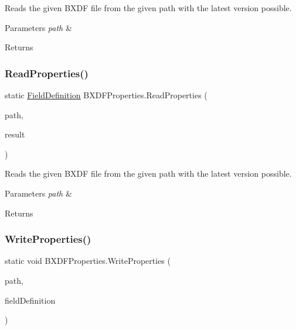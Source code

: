 Reads the given B\+X\+DF file from the given path with the latest version possible. 


\begin{DoxyParams}{Parameters}
{\em path} & \\
\hline
\end{DoxyParams}
\begin{DoxyReturn}{Returns}

\end{DoxyReturn}
\mbox{\label{class_b_x_d_f_properties_a4690668063ed6c1162c495a7c3f9f0b4}} 
\subsubsection{\texorpdfstring{Read\+Properties()}{ReadProperties()}\hspace{0.1cm}{\footnotesize\ttfamily [2/2]}}
{\footnotesize\ttfamily static \hyperlink{class_field_definition}{Field\+Definition} B\+X\+D\+F\+Properties.\+Read\+Properties (\begin{DoxyParamCaption}\item[{string}]{path,  }\item[{out string}]{result }\end{DoxyParamCaption})\hspace{0.3cm}{\ttfamily [static]}}



Reads the given B\+X\+DF file from the given path with the latest version possible. 


\begin{DoxyParams}{Parameters}
{\em path} & \\
\hline
\end{DoxyParams}
\begin{DoxyReturn}{Returns}

\end{DoxyReturn}
\mbox{\label{class_b_x_d_f_properties_ad03a0259c98a0a1f59ffec47d7688185}} 
\subsubsection{\texorpdfstring{Write\+Properties()}{WriteProperties()}}
{\footnotesize\ttfamily static void B\+X\+D\+F\+Properties.\+Write\+Properties (\begin{DoxyParamCaption}\item[{string}]{path,  }\item[{\hyperlink{class_field_definition}{Field\+Definition}}]{field\+Definition }\end{DoxyParamCaption})\hspace{0.3cm}{\ttfamily [static]}}



